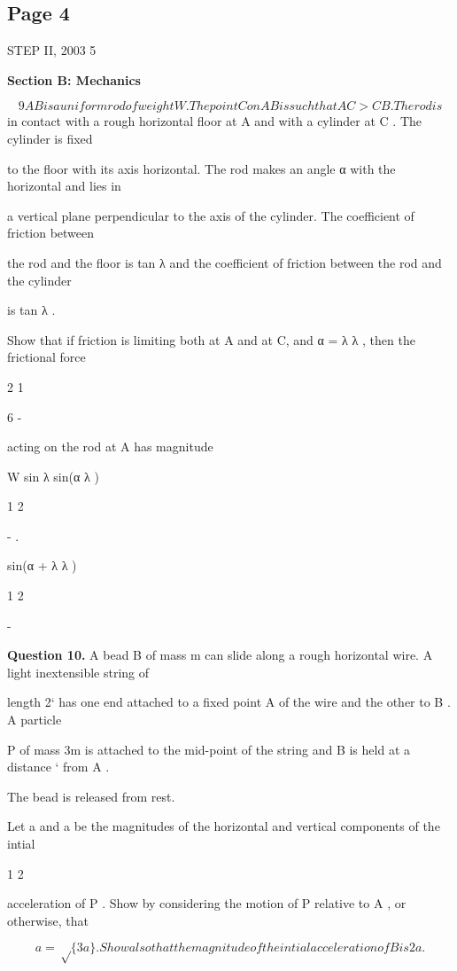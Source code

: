 \documentclass[12pt]{article}
\begin{document}
\subsection*{Page 4}
\begin{flushleft}
STEP II, 2003 5\par
\bigskip\textbf{Section B: Mechanics}\par
\[9 AB is a uniform rod of weight W . The point C on AB is such that AC > CB . The rod is\]
in contact with a rough horizontal floor at A and with a cylinder at C . The cylinder is fixed\par
to the floor with its axis horizontal. The rod makes an angle α with the horizontal and lies in\par
a vertical plane perpendicular to the axis of the cylinder. The coefficient of friction between\par
the rod and the floor is tan λ and the coefficient of friction between the rod and the cylinder\par
is tan λ .\par
Show that if friction is limiting both at A and at C, and α = λ λ , then the frictional force\par
2 1\par
6 -\par
acting on the rod at A has magnitude\par
W sin λ sin(α λ )\par
1 2\par
- .\par
sin(α + λ λ )\par
1 2\par
-\par
\bigskip\textbf{Question 10.} A bead B of mass m can slide along a rough horizontal wire. A light inextensible string of\par
length 2` has one end attached to a fixed point A of the wire and the other to B . A particle\par
P of mass 3m is attached to the mid-point of the string and B is held at a distance ` from A .\par
The bead is released from rest.\par
Let a and a be the magnitudes of the horizontal and vertical components of the intial\par
1 2\par
acceleration of P . Show by considering the motion of P relative to A , or otherwise, that\par
\[a = \sqrt\{3a\} . Show also that the magnitude of the intial acceleration of B is 2a .\]

\end{flushleft}
\end{document}
